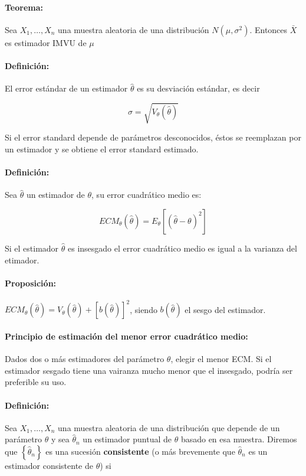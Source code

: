 \paragraph{Teorema:} Sea $X_1,\dots,X_n$ una muestra aleatoria de una distribución $N(\mu,\sigma^2)$. Entonces $\bar{X}$ es estimador IMVU de $\mu$

\paragraph{Definición:} El error estándar de un estimador $\hat{\theta}$ es su desviación estándar, es decir

$$\sigma = \sqrt{V_\theta(\hat{\theta})}$$

Si el error standard depende de parámetros desconocidos, éstos se reemplazan por un estimador y se obtiene el error standard estimado.

\paragraph{Definición:} Sea $\hat{\theta}$ un estimador de $\theta$, su error cuadrático medio es:

$$ECM_\theta(\hat{\theta}) = E_\theta\left[\left(\hat{\theta}-\theta\right)^2\right]$$

Si el estimador $\hat{\theta}$ es insesgado el error cuadrático medio es igual a la varianza del etimador.

\paragraph{Proposición:} $ECM_\theta(\hat{\theta}) = V_\theta(\hat{\theta}) + \left[b(\hat{\theta})\right]^2$, siendo $b(\hat{\theta})$ el sesgo del estimador.

\paragraph{Principio de estimación del menor error cuadrático medio:} Dados dos o más estimadores del parámetro $\theta$, elegir el menor ECM. Si el estimador sesgado tiene una vairanza mucho menor que el insesgado, podría ser preferible su uso.

\paragraph{Definición:}Sea $X_1,\dots,X_n$ una muestra aleatoria de una distribución que depende de un parámetro $\theta$ y sea $\hat{\theta}_n$ un estimador puntual de $\theta$ basado en esa muestra. Diremos que $\left\{\hat{\theta}_n\right\}$ es una sucesión \textbf{consistente} (o más brevemente que $\hat{\theta}_n$ es un estimador consistente de $\theta$) si

